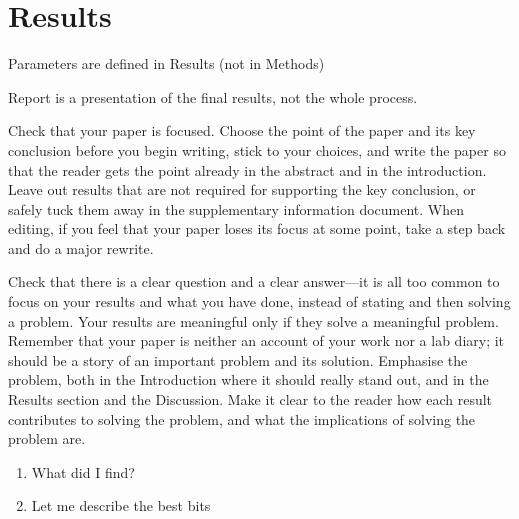 \chapter{Results} \label{Chapter: Results}

Parameters are defined in Results (not in Methods)

Report is a presentation of the final results, not the whole process.

Check that your paper is focused. Choose the point of the paper and its key conclusion before you begin writing, stick to your choices, and write the paper so that the reader gets the point already in the abstract and in the introduction. Leave  out results that are not required for supporting the key conclusion, or safely tuck them away in the supplementary information document. When editing, if you feel that your paper loses its focus at some point, take a step back and do a major rewrite.

Check that there is a clear question and a clear answer—it is all too common to focus on your results and what you have done, instead of stating and then solving a problem. Your results are meaningful only if they solve a meaningful problem. Remember that your paper is neither an account of your work nor a lab diary; it should be a story of an important problem and its solution. Emphasise the problem, both in the Introduction where it should really stand out, and in the Results section and the Discussion. Make it clear to the reader how each result contributes to solving the problem, and what the implications of solving the problem are.

\begin{enumerate}
\item What did I find?
\item Let me describe the best bits
\end{enumerate}
